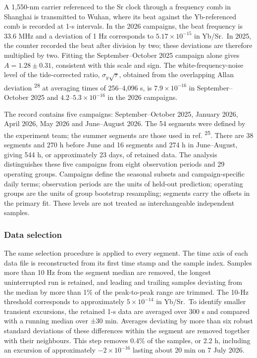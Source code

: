 \documentclass[
  11pt,
  a4paper,
]{article}
\begin{document}
A 1,550-nm carrier referenced to the Sr clock through a frequency comb
in Shanghai is transmitted to Wuhan, where its beat against the
Yb-referenced comb is recorded at 1-s intervals. In the 2026 campaigns,
the beat frequency is 33.6 MHz and a deviation of 1 Hz corresponds to
\(5.17\times10^{-15}\) in Yb/Sr.~In 2025, the counter recorded the beat
after division by two; these deviations are therefore multiplied by two.
Fitting the September--October 2025 campaign alone gives
\(A=1.28\pm0.31\), consistent with this scale and sign. The
white-frequency-noise level of the tide-corrected ratio,
\(\sigma_y\sqrt{\tau}\), obtained from the overlapping Allan deviation
\textsuperscript{28} at averaging times of 256--4,096 s, is
\(7.9\times10^{-16}\) in September--October 2025 and
\(4.2\)--\(5.3\times10^{-16}\) in the 2026 campaigns.

The record contains five campaigns: September--October 2025, January
2026, April 2026, May 2026 and June--August 2026. The 54 segments were
defined by the experiment team; the summer segments are those used in
ref. \textsuperscript{25}. There are 38 segments and 270 h before June
and 16 segments and 274 h in June--August, giving 544 h, or
approximately 23 days, of retained data. The analysis distinguishes
these five campaigns from eight observation periods and 29 operating
groups. Campaigns define the seasonal subsets and campaign-specific
daily terms; observation periods are the units of held-out prediction;
operating groups are the units of group bootstrap resampling; segments
carry the offsets in the primary fit. These levels are not treated as
interchangeable independent samples.

\hypertarget{data-selection}{%
\subsubsection{Data selection}\label{data-selection}}

The same selection procedure is applied to every segment. The time axis
of each data file is reconstructed from its first time stamp and the
sample index. Samples more than 10 Hz from the segment median are
removed, the longest uninterrupted run is retained, and leading and
trailing samples deviating from the median by more than 1\% of the
peak-to-peak range are trimmed. The 10-Hz threshold corresponds to
approximately \(5\times10^{-14}\) in Yb/Sr.~To identify smaller
transient excursions, the retained 1-s data are averaged over 300 s and
compared with a running median over ±30 min. Averages deviating by more
than six robust standard deviations of these differences within the
segment are removed together with their neighbours. This step removes
0.4\% of the samples, or 2.2 h, including an excursion of approximately
\(-2\times10^{-16}\) lasting about 20 min on 7 July 2026.
\end{document}

